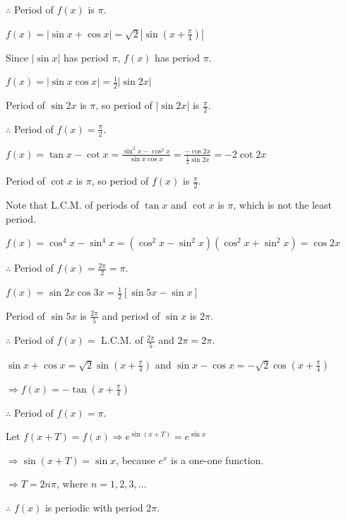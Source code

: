   $\therefore$ Period of $f(x)$ is $\pi$.

\item $f(x) = |\sin x + \cos x| = \sqrt{2}\left|\sin\left(x + \frac{\pi}{4}\right)\right|$

  Since $|\sin x|$ has period $\pi$, $f(x)$ has period $\pi$.

\item $f(x) = |\sin x\cos x| = \frac{1}{2}|\sin2x|$

  Period of $\sin2x$ is $\pi$, so period of $|\sin2x|$ is $\frac{\pi}{2}$.

  $\therefore$ Period of $f(x) = \frac{\pi}{2}$.

\item $f(x) = \tan x - \cot x = \frac{\sin^2x - \cos^2x}{\sin x\cos x} = \frac{-\cos2x}{\frac{1}{2}\sin2x}
  = -2\cot2x$

  Period of $\cot x$ is $\pi$, so period of $f(x)$ is $\frac{\pi}{2}$.

  Note that L.C.M. of periods of $\tan x$ and $\cot x$ is $\pi$, which is not the least period.

\item $f(x) = \cos^4x - \sin^4x = (\cos^2x - \sin^2x)(\cos^2x + \sin^2x) = \cos2x$

  $\therefore$ Period of $f(x) = \frac{2\pi}{2} = \pi$.

\item $f(x) = \sin2x\cos3x = \frac{1}{2}[\sin5x - \sin x]$

  Period of $\sin5x$ is $\frac{2\pi}{5}$ and period of $\sin x$ is $2\pi$.

  $\therefore$ Period of $f(x) = $ L.C.M. of $\frac{2\pi}{5}$ and $2\pi = 2\pi$.

\item $\sin x + \cos x = \sqrt{2}\sin\left(x + \frac{\pi}{4}\right)$ and $\sin x - \cos x =
  -\sqrt{2}\cos\left(x + \frac{\pi}{4}\right)$

  $\Rightarrow f(x) = -\tan\left(x + \frac{\pi}{4}\right)$

  $\therefore$ Period of $f(x) = \pi$.

\item Let $f(x + T) = f(x) \Rightarrow e^{\sin(x + T)} = e^{\sin x}$

  $\Rightarrow \sin(x + T) = \sin x$, because $e^x$ is a one-one function.

  $\Rightarrow T = 2n\pi$, where $n = 1, 2, 3, \ldots$

  $\therefore$ $f(x)$ is periodic with period $2\pi$.

